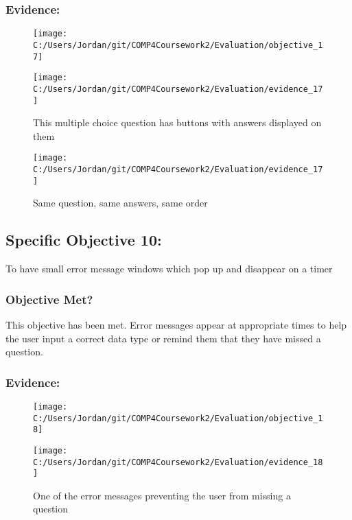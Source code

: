 \subsubsection{Evidence: }

\begin{figure}[H]
	\texttt{[image: C:/Users/Jordan/git/COMP4Coursework2/Evaluation/objective\_17]}
\end{figure}

\begin{figure}[H]
	\texttt{[image: C:/Users/Jordan/git/COMP4Coursework2/Evaluation/evidence\_17]}
	\caption{This multiple choice question has buttons with answers displayed on them}
\end{figure}

\begin{figure}[H]
	\texttt{[image: C:/Users/Jordan/git/COMP4Coursework2/Evaluation/evidence\_17]}
	\caption{Same question, same answers, same order}
\end{figure}

\subsection{Specific Objective 10: }

To have small error message windows which pop up and disappear on a timer

\subsubsection{Objective Met?}

This objective has been met. Error messages appear at appropriate times to help the user input a correct data type or remind them that they have missed a question.

\subsubsection{Evidence: }

\begin{figure}[H]
	\texttt{[image: C:/Users/Jordan/git/COMP4Coursework2/Evaluation/objective\_18]}
\end{figure}

\begin{figure}[H]
	\texttt{[image: C:/Users/Jordan/git/COMP4Coursework2/Evaluation/evidence\_18]}
	\caption{One of the error messages preventing the user from missing a question}
\end{figure}

